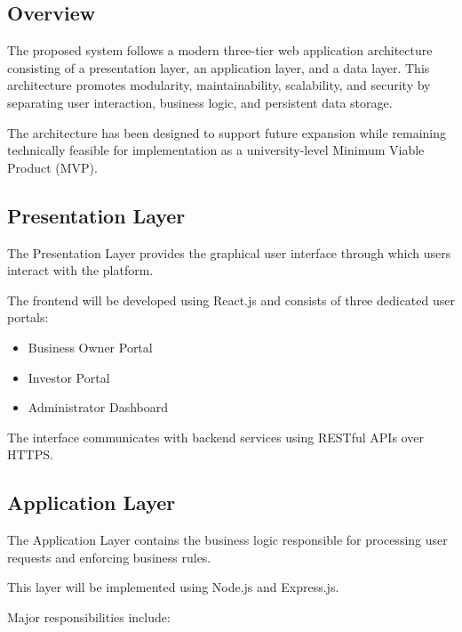 \subsection{Overview}

The proposed system follows a modern three-tier web application architecture consisting of a presentation layer, an application layer, and a data layer. This architecture promotes modularity, maintainability, scalability, and security by separating user interaction, business logic, and persistent data storage.

The architecture has been designed to support future expansion while remaining technically feasible for implementation as a university-level Minimum Viable Product (MVP).


\subsection{Presentation Layer}

The Presentation Layer provides the graphical user interface through which users interact with the platform.

The frontend will be developed using React.js and consists of three dedicated user portals:

\begin{itemize}
\item Business Owner Portal
\item Investor Portal
\item Administrator Dashboard
\end{itemize}

The interface communicates with backend services using RESTful APIs over HTTPS.


\subsection{Application Layer}

The Application Layer contains the business logic responsible for processing user requests and enforcing business rules.

This layer will be implemented using Node.js and Express.js.

Major responsibilities include:

